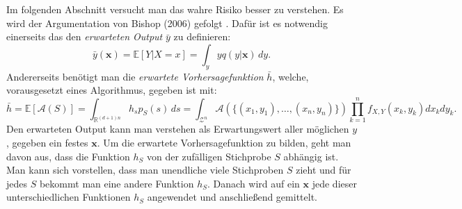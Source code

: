 Im folgenden Abschnitt versucht man das wahre Risiko besser zu verstehen. Es wird der Argumentation von Bishop (2006) gefolgt \cite{bishop}.
Daf\"ur ist es notwendig einerseits das den \textit{erwarteten Output} $\bar{y}$ zu definieren:
$$ \bar{y}(\mathbf{x}) = \mathbb{E}[Y|X=x] = \int_y y q(y|\mathbf{x}) \, dy.$$
Andererseits ben\"otigt man die \textit{erwartete Vorhersagefunktion} $\bar{h}$, welche, vorausgesetzt eines Algorithmus, gegeben ist mit:
$$ \bar{h} = \mathbb{E}[\mathcal{A}(S)] = \int_{\mathbb{R}^{(d+1)n}} h_s p_S(s)  \,ds = 
\int_{\mathcal{Z}^n}\mathcal{A}(\{ (x_1, y_1), \dots ,(x_n, y_n)\}) \prod_{k=1}^n f_{X,Y}(x_k, y_k)dx_k dy_k.$$ 
Den erwarteten Output kann man verstehen als Erwartungswert aller m\"oglichen $y$, gegeben ein festes $\mathbf{x}$. 
Um die erwartete Vorhersagefunktion zu bilden, geht man davon aus, dass 
die Funktion $h_S$ von der zuf\"alligen Stichprobe $S$ abh\"angig ist. Man kann sich vorstellen, dass man unendliche viele Stichproben $S$ zieht und 
f\"ur jedes $S$ bekommt man eine andere Funktion $h_S$. Danach wird auf ein $\mathbf{x}$ jede dieser unterschiedlichen Funktionen $h_S$ angewendet und 
anschlie{\ss}end gemittelt. \\


